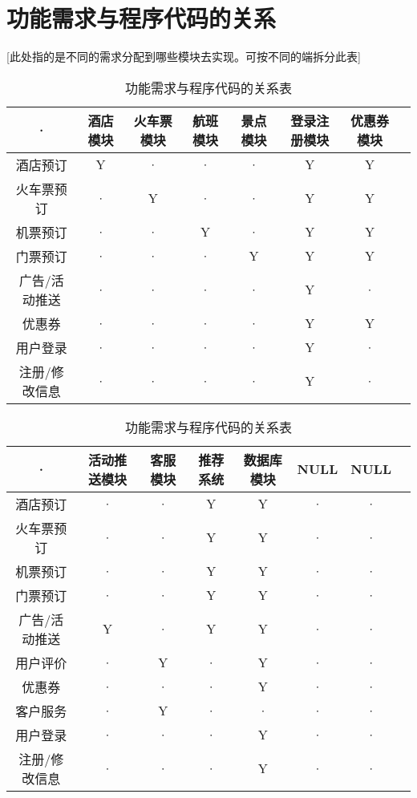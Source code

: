 \section{功能需求与程序代码的关系}
[此处指的是不同的需求分配到哪些模块去实现。可按不同的端拆分此表]
\begin{table}[htbp]
\centering
\caption{功能需求与程序代码的关系表} \label{tab:requirement-module}
\begin{tabular}{|c|c|c|c|c|c|c|c|}
    \hline
    · & 酒店模块 & 火车票模块 & 航班模块 & 景点模块 & 登录注册模块 & 优惠券模块 \\
    \hline
    酒店预订 & Y & · & · & · & Y & Y \\
    \hline
    火车票预订 & · & Y & · & · & Y & Y \\
    \hline
    机票预订 & · & · & Y & · & Y & Y \\
    \hline
    门票预订 & · & · & · & Y & Y & Y \\
    \hline
    广告/活动推送 & · & · & · & · & Y & · \\
    \hline
    优惠券 & · & · & · & · & Y & Y \\
    \hline
    用户登录 & · & · & · & · & Y & · \\
    \hline
    注册/修改信息 & · & · & · & · & Y & · \\
    \hline


\end{tabular}
\begin{tabular}{|c|c|c|c|c|c|c|c|}
    \hline
    · & 活动推送模块 & 客服模块 & 推荐系统 & 数据库模块 & NULL & NULL \\
    \hline
    酒店预订 & · & · & Y & Y & · & · \\
    \hline
    火车票预订 & · & · & Y & Y & · & · \\
    \hline
    机票预订 & · & · & Y & Y & · & · \\
    \hline
    门票预订 & · & · & Y & Y & · & · \\
    \hline
    广告/活动推送 & Y & · & Y & Y & · & · \\
    \hline
    用户评价 & · & Y & · & Y & · & · \\
    \hline
    优惠券 & · & · & · & Y & · & · \\
    \hline
    客户服务 & · & Y & · & · & · & · \\
    \hline
    用户登录 & · & · & · & Y & · & · \\
    \hline
    注册/修改信息 & · & · & · & Y & · & · \\
    \hline
\end{tabular}
\end{table}